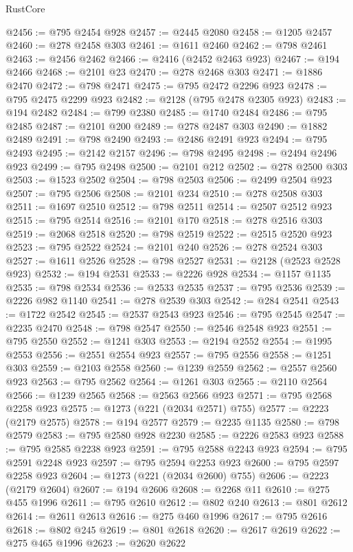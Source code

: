 \begin{lexlean}{RustCore}
\begin{coremodule}
@2456 := @795 @2454 @928
@2457 := @2445 @2080
@2458 := @1205 @2457
@2460 := @278 @2458 @303
@2461 := @1611 @2460
@2462 := @798 @2461
@2463 := @2456 @2462
@2466 := @2416 (@2452 @2463 @923)
@2467 := @194 @2466
@2468 := @2101 @23
@2470 := @278 @2468 @303
@2471 := @1886 @2470
@2472 := @798 @2471
@2475 := @795 @2472 @2296 @923
@2478 := @795 @2475 @2299 @923
@2482 := @2128 (@795 @2478 @2305 @923)
@2483 := @194 @2482
@2484 := @799 @2380
@2485 := @1740 @2484
@2486 := @795 @2485
@2487 := @2101 @200
@2489 := @278 @2487 @303
@2490 := @1882 @2489
@2491 := @798 @2490
@2493 := @2486 @2491 @923
@2494 := @795 @2493
@2495 := @2142 @2157
@2496 := @798 @2495
@2498 := @2494 @2496 @923
@2499 := @795 @2498
@2500 := @2101 @212
@2502 := @278 @2500 @303
@2503 := @1523 @2502
@2504 := @798 @2503
@2506 := @2499 @2504 @923
@2507 := @795 @2506
@2508 := @2101 @234
@2510 := @278 @2508 @303
@2511 := @1697 @2510
@2512 := @798 @2511
@2514 := @2507 @2512 @923
@2515 := @795 @2514
@2516 := @2101 @170
@2518 := @278 @2516 @303
@2519 := @2068 @2518
@2520 := @798 @2519
@2522 := @2515 @2520 @923
@2523 := @795 @2522
@2524 := @2101 @240
@2526 := @278 @2524 @303
@2527 := @1611 @2526
@2528 := @798 @2527
@2531 := @2128 (@2523 @2528 @923)
@2532 := @194 @2531
@2533 := @2226 @928
@2534 := @1157 @1135
@2535 := @798 @2534
@2536 := @2533 @2535
@2537 := @795 @2536
@2539 := @2226 @982 @1140
@2541 := @278 @2539 @303
@2542 := @284 @2541
@2543 := @1722 @2542
@2545 := @2537 @2543 @923
@2546 := @795 @2545
@2547 := @2235 @2470
@2548 := @798 @2547
@2550 := @2546 @2548 @923
@2551 := @795 @2550
@2552 := @1241 @303
@2553 := @2194 @2552
@2554 := @1995 @2553
@2556 := @2551 @2554 @923
@2557 := @795 @2556
@2558 := @1251 @303
@2559 := @2103 @2558
@2560 := @1239 @2559
@2562 := @2557 @2560 @923
@2563 := @795 @2562
@2564 := @1261 @303
@2565 := @2110 @2564
@2566 := @1239 @2565
@2568 := @2563 @2566 @923
@2571 := @795 @2568 @2258 @923
@2575 := @1273 (@221 (@2034 @2571) @755)
@2577 := @2223 (@2179 @2575)
@2578 := @194 @2577
@2579 := @2235 @1135
@2580 := @798 @2579
@2583 := @795 @2580 @928 @2230
@2585 := @2226 @2583 @923
@2588 := @795 @2585 @2238 @923
@2591 := @795 @2588 @2243 @923
@2594 := @795 @2591 @2248 @923
@2597 := @795 @2594 @2253 @923
@2600 := @795 @2597 @2258 @923
@2604 := @1273 (@221 (@2034 @2600) @755)
@2606 := @2223 (@2179 @2604)
@2607 := @194 @2606
@2608 := @2268 @11
@2610 := @275 @455 @1996
@2611 := @795 @2610
@2612 := @802 @240
@2613 := @801 @2612
@2614 := @2611 @2613
@2616 := @275 @460 @1996
@2617 := @795 @2616
@2618 := @802 @245
@2619 := @801 @2618
@2620 := @2617 @2619
@2622 := @275 @465 @1996
@2623 := @2620 @2622

\end{coremodule}
\end{lexlean}
